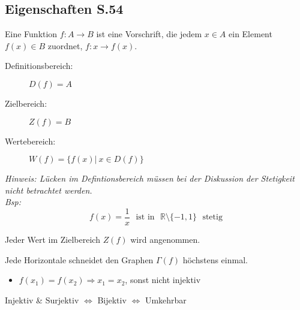 \subsection{Eigenschaften \texorpdfstring{\hfill S.54}{S.54}}
    Eine Funktion $f : A \to B$ ist eine Vorschrift, die jedem $x \in A$ ein Element $f(x) \in B$ zuordnet, $f: x \to f(x)$.
    \begin{description}
        \item[Definitionsbereich:] $D(f) = A$
        \item[Zielbereich:] $Z(f) = B$
        \item[Wertebereich:] $W(f) = \{ f(x) \vert \ x \in D(f)\}$   
    \end{description}
    
    \textit{Hinweis: Lücken im Defintionsbereich müssen bei der Diskussion der Stetigkeit nicht betrachtet werden.\\ Bsp:}
    \small{$$ f(x) = \frac{1}{x} \hspace{8pt} \textrm{ist in} \hspace{8pt} \mathbb{R} \setminus \{-1, 1 \} \hspace{8pt} \textrm{stetig}$$}
    
    \vspace{3pt}
    
        Jeder Wert im Zielbereich $Z(f)$ wird angenommen.
        
    \begin{samepage}
         \vspace{3pt}
        Jede Horizontale schneidet den Graphen $\Gamma(f)$ höchstens einmal.
        \begin{itemize}
            \item $f(x_1) = f(x_2) \Rightarrow x_1 = x_2$, sonst nicht injektiv
        \end{itemize}
    \end{samepage}
        
    \vspace{3pt}
    
        \begin{center}
            Injektiv \& Surjektiv $\Leftrightarrow$ Bijektiv $\Leftrightarrow$ Umkehrbar
        \end{center}
    \vspace{3pt}
    

